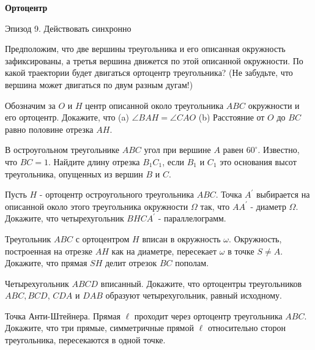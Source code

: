 \centerline{\bf \Huge Ортоцентр}

\begin{flushright}
        \scriptsize{Эпизод 9. Действовать синхронно}
\end{flushright}

\problem{}
Предположим, что две вершины треугольника и его описанная окружность зафиксированы, а третья вершина движется по этой описанной окружности. По какой траектории будет двигаться ортоцентр треугольника? (Не забудьте, что вершина может двигаться по двум разным дугам!)

\problem{}
Обозначим за $O$ и $H$ центр описанной около треугольника $A B C$ окружности и его ортоцентр. Докажите, что
(a) $\angle B A H=\angle C A O$
(b) Расстояние от $O$ до $B C$ равно половине отрезка $A H$.

\problem{}
В остроугольном треугольнике $A B C$ угол при вершине $A$ равен $60^{\circ}$. Известно, что $B C=1$. Найдите длину отрезка $B_1 C_1$, если $B_1$ и $C_1$ это основания высот треугольника, опущенных из вершин $B$ и $C$.

\problem{}
Пусть $H$ - ортоцентр остроугольного треугольника $A B C$. Точка $A^{\prime}$ выбирается на описанной около этого треугольника окружности $\Omega$ так, что $A A^{\prime}$ - диаметр $\Omega$. Докажите, что четырехугольник $B H C A^{\prime}$ - параллелограмм.

\problem{}
Треугольник $A B C$ с ортоцентром $H$ вписан в окружность $\omega$. Окружность, построенная на отрезке $A H$ как на диаметре, пересекает $\omega$ в точке $S \neq A$. Докажите, что прямая $S H$ делит отрезок $B C$ пополам.

\problem{}
Четырехугольник $A B C D$ вписанный. Докажите, что ортоцентры треугольников $A B C, B C D$, $C D A$ и $D A B$ образуют четырехугольник, равный исходному.

\problem{}
Точка Анти-Штейнера. Прямая $\ell$ проходит через ортоцентр треугольника $A B C$. Докажите, что три прямые, симметричные прямой $\ell$ относительно сторон треугольника, пересекаются в одной точке.